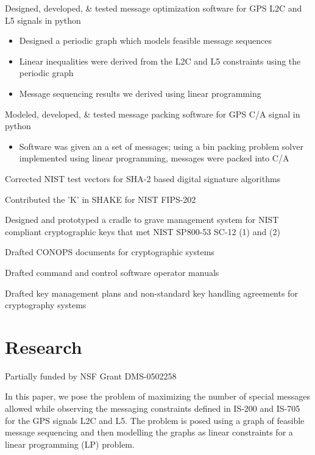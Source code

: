 \documentclass[letterpaper]{clinton-resume}
\begin{document}
\begin{minipage}[t]{0.66\textwidth}

\begin{tightitemize}
\item Designed, developed, \& tested message optimization software for GPS L2C and L5 signals in python
\begin{itemize}
\item Designed a periodic graph which models feasible message sequences
\item Linear inequalities were derived from the L2C and L5 constraints using the periodic graph
\item Message sequencing results we derived using linear programming
\end{itemize}
\item Modeled, developed, \& tested message packing software for GPS C/A signal in python
\begin{itemize}
\item Software was given an a set of messages; using a bin packing problem solver implemented using linear programming, messages were packed into C/A
\end{itemize}
\item Corrected NIST test vectors for SHA-2 based digital signature algorithms
\item Contributed the 'K' in SHAKE for NIST FIPS-202
\item Designed and prototyped a cradle to grave management system for NIST compliant cryptographic keys that met NIST SP800-53 SC-12 (1) and (2)
\item Drafted CONOPS documents for cryptographic systems
\item Drafted command and control software operator manuals
\item Drafted key management plans and non-standard key handling agreements for cryptography systems
\end{tightitemize}
\sectionspace
\section{Research}
Partially funded by NSF Grant DMS-0502258

\begin{myframedenv}
In this paper, we pose the problem of maximizing the number of special messages allowed while observing the messaging constraints defined in IS-200 and IS-705 for the GPS signals L2C and L5.  The problem is posed using a graph of feasible message sequencing and then modelling the graphs as linear constraints for a linear programming (LP) problem.
\end{myframedenv}
\sectionspace

\end{minipage}
\end{document}

